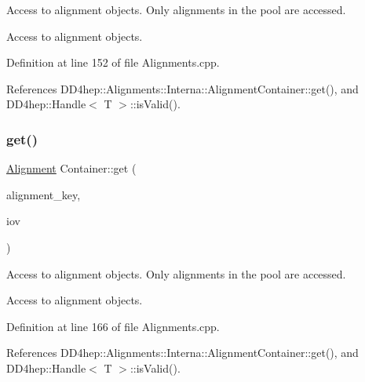 Access to alignment objects. Only alignments in the pool are accessed. 

Access to alignment objects. 

Definition at line 152 of file Alignments.\+cpp.



References D\+D4hep\+::\+Alignments\+::\+Interna\+::\+Alignment\+Container\+::get(), and D\+D4hep\+::\+Handle$<$ T $>$\+::is\+Valid().

\hypertarget{class_d_d4hep_1_1_alignments_1_1_container_a36da0db1c28a345f4363738dca05c023}{}\label{class_d_d4hep_1_1_alignments_1_1_container_a36da0db1c28a345f4363738dca05c023} 
\subsubsection{\texorpdfstring{get()}{get()}\hspace{0.1cm}{\footnotesize\ttfamily [4/4]}}
{\footnotesize\ttfamily \hyperlink{class_d_d4hep_1_1_alignments_1_1_alignment}{Alignment} Container\+::get (\begin{DoxyParamCaption}\item[{\hyperlink{class_d_d4hep_1_1_alignments_1_1_container_a4101ffa946cedbaf996682533e57c44e}{key\+\_\+type}}]{alignment\+\_\+key,  }\item[{const \hyperlink{class_d_d4hep_1_1_conditions_1_1_user_pool}{User\+Pool} \&}]{iov }\end{DoxyParamCaption})}



Access to alignment objects. Only alignments in the pool are accessed. 

Access to alignment objects. 

Definition at line 166 of file Alignments.\+cpp.



References D\+D4hep\+::\+Alignments\+::\+Interna\+::\+Alignment\+Container\+::get(), and D\+D4hep\+::\+Handle$<$ T $>$\+::is\+Valid().

\hypertarget{class_d_d4hep_1_1_alignments_1_1_container_a95b375e1bc0e962b8e226467f6b39221}{}\label{class_d_d4hep_1_1_alignments_1_1_container_a95b375e1bc0e962b8e226467f6b39221} 
